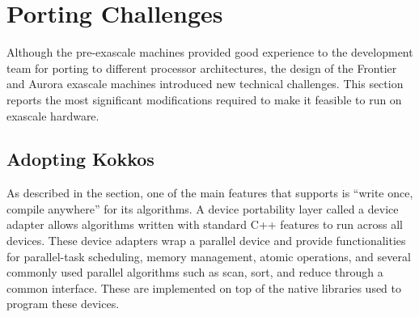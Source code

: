 \section{Porting Challenges}

Although the pre-exascale machines provided good experience to the \vtkm development team for porting to different processor architectures, the design of the Frontier and Aurora exascale machines introduced new technical challenges.
This section reports the most significant modifications required to make it feasible to run \vtkm on exascale hardware.


\subsection{Adopting Kokkos}
\label{sec:adopting-kokkos}


As described in the  section,
one of the main features that \vtkm supports is ``write once, compile anywhere'' for its algorithms.
A device portability layer called a device adapter allows algorithms written with standard C++ features to run across all devices.
These device adapters wrap a parallel device and provide functionalities for parallel-task scheduling, memory management, atomic operations, and several commonly used parallel algorithms such as scan, sort, and reduce through a common interface.
These are implemented on top of the native libraries used to program these devices.

